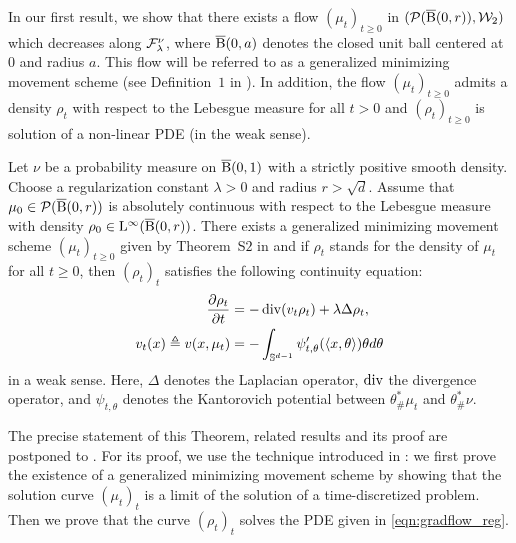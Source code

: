 In our first result, we show that there exists a flow $(\mu_t)_{t\geq0}$ in $({\cal P}(\operatorname{\overline{B}}(0,r)),{\cal W}_2)$ which decreases along ${\cal F}_\lambda^\nu$, where $\operatorname{\overline{B}}(0,a)$ denotes the closed unit ball centered at $0$ and radius $a$. This flow will be referred to as a generalized minimizing movement scheme (see Definition~$1$ in \supp).  In addition, the flow $(\mu_t)_{t \geq 0}$ admits a density $\rho_t$ with respect to the Lebesgue measure for all $t>0$ and $(\rho_t)_{t \geq 0}$ is solution of a non-linear PDE (in the weak sense). %
%
%
\begin{thm}
\label{thm:continuity}
Let $\nu$ be a probability measure on $\operatorname{\overline{B}}(0,1)$ with a strictly positive smooth density. Choose a regularization constant $\lambda > 0$ and radius $r > \sqrt{d}$. Assume that $\mu_0 \in \mathcal{P}(\operatorname{\overline{B}}(0,r))$ is absolutely continuous with respect to the Lebesgue measure with density $\rho_0 \in \mathrm{L}^{\infty}(\operatorname{\overline{B}}(0,r))$. There exists a generalized minimizing movement scheme  $(\mu_t)_{t \geq 0}$ given by Theorem~S$2$ in \supp and if $\rho_t$ stands for the density of $\mu_t$ for all $t \geq 0$, then $(\rho_t)_t$ satisfies the following continuity equation:
\begin{align}
\frac{\partial \rho_t}{\partial t}   &= -\operatorname{div} (v_t \rho_t) + \lambda \Delta \rho_t, \\
v_t(x) \triangleq v(x,\mu_t) &= - \int_{\mathbb{S}^{d-1}} \psi_{t, \theta}'(\langle x , \theta \rangle ) \theta d\theta  \label{eqn:gradflow_reg}
\end{align}
in a weak sense. Here, $\Delta$ denotes the Laplacian operator, $\operatorname{div}$ the divergence operator, and $\psi_{t,\theta}$ denotes the Kantorovich potential between $\theta^*_{\#}\mu_t$ and $\theta^*_{\#}\nu$.
\end{thm}
The precise statement of this Theorem, related results and its proof are postponed to \supp. For its proof, we use the technique introduced in \cite{jordan1998variational}: we first prove the existence of a generalized minimizing movement scheme by showing that the solution curve $(\mu_t)_t$ is a limit of the solution of a time-discretized problem. Then we prove that the curve $(\rho_t)_t$ solves the PDE given in \eqref{eqn:gradflow_reg}.





